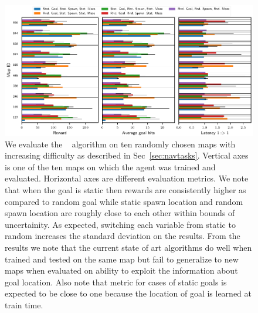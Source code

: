 %
\begin{figure}%
  \includegraphics[width=\linewidth]{images/plot_summary_bar_plots.pdf}%
  \vspace{-1em}%
  \caption{
    We evaluate the \NavAiiiCDiDiiL{}~\cite{MiPaViICLR2017} algorithm on ten randomly chosen maps with increasing difficulty as described in Sec~\ref{sec:navtasks}.
  Vertical axes is one of the ten maps on which the agent was trained and evaluated.
  Horizontal axes are different evaluation metrics.
  We note that when the goal is static then rewards are consistently higher as compared to random goal while static spawn location and random spawn location are roughly close to each other within bounds of uncertainity. As expected, switching each variable from static to random increases the standard deviation on the results.
  From the \LatencyOneGtOne{} results we note that the current state of art algorithms do well when trained and tested on the same map but fail to generalize to new maps when evaluated on ability to exploit the information about goal location.
  Also note that \LatencyOneGtOne{} metric for cases of static goals is expected to be close to one because the location of goal is learned at train time.
  }%
\label{fig:latency-goal-reward}%
\end{figure}


